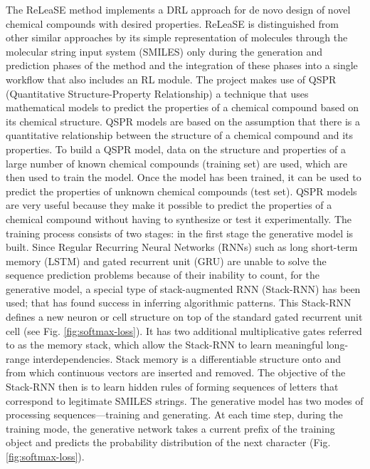 \documentclass[a4paper]{article}
\begin{document}
The ReLeaSE method implements a DRL approach for de novo design of novel chemical compounds with desired properties. ReLeaSE is distinguished from other similar approaches by its simple representation of molecules through the molecular string input system (SMILES) only during the generation and prediction phases of the method and the integration of these phases into a single workflow that also includes an RL module. 
The project makes use of QSPR (Quantitative Structure-Property Relationship) a technique that uses mathematical models to predict the properties of a chemical compound based on its chemical structure. QSPR models are based on the assumption that there is a quantitative relationship between the structure of a chemical compound and its properties. To build a QSPR model, data on the structure and properties of a large number of known chemical compounds (training set) are used, which are then used to train the model. Once the model has been trained, it can be used to predict the properties of unknown chemical compounds (test set). QSPR models are very useful because they make it possible to predict the properties of a chemical compound without having to synthesize or test it experimentally.
The training process consists of two stages: in the first stage the generative model is built.
Since Regular Recurring Neural Networks (RNNs) such as long short-term memory (LSTM) \cite{lstm} and gated recurrent unit (GRU) \cite{gru} are unable to solve the sequence prediction problems because of their inability to count, for the generative model, a special type of stack-augmented RNN (Stack-RNN) \cite{stack-rnn} has been used; that has found success in inferring algorithmic patterns. This Stack-RNN defines a new neuron or cell structure on top of the standard gated recurrent unit \cite{grnn} cell (see Fig. \ref{fig:softmax-loss}). It has two additional multiplicative gates referred to as the memory stack, which allow the Stack-RNN to learn meaningful long-range interdependencies. Stack memory is a differentiable structure onto and from which continuous vectors are inserted and removed. The objective of the Stack-RNN then is to learn hidden rules of forming sequences of letters that correspond to legitimate SMILES strings.
The generative model has two modes of processing sequences—training and generating.  
At each time step, during the training mode, the generative network takes a current prefix of the training object and predicts the probability distribution of the next character (Fig. \ref{fig:softmax-loss}). 
\end{document}
